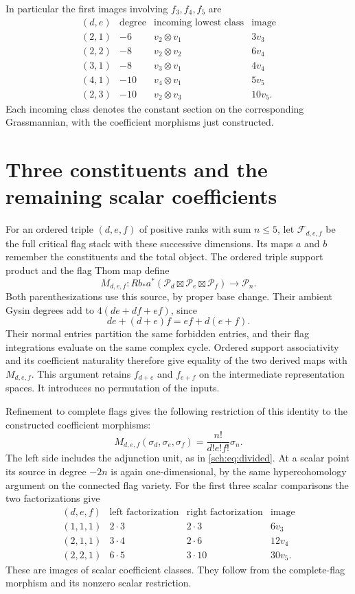 In particular the first images involving $f_3,f_4,f_5$ are
\[
\begin{array}{c|c|c|c}
 (d,e)&\text{degree}&\text{incoming lowest class}&\text{image}\\\hline
 (2,1)&-6&v_2\otimes v_1&3v_3\\
 (2,2)&-8&v_2\otimes v_2&6v_4\\
 (3,1)&-8&v_3\otimes v_1&4v_4\\
 (4,1)&-10&v_4\otimes v_1&5v_5\\
 (2,3)&-10&v_2\otimes v_3&10v_5.
\end{array}
\]
Each incoming class denotes the constant section on the corresponding
Grassmannian, with the coefficient morphisms just constructed.

\section{Three constituents and the remaining scalar coefficients}
\label{sch:sec:coherence}

For an ordered triple $(d,e,f)$ of positive ranks with sum $n\leq5$,
let $\mathcal F_{d,e,f}$ be the full critical flag stack with these
successive dimensions. Its maps $a$ and $b$ remember the constituents
and the total object. The ordered triple support product and the flag
Thom map define
\[
 M_{d,e,f}:Rb_*a^*(\mathcal P_d\boxtimes\mathcal P_e
                         \boxtimes\mathcal P_f)\longrightarrow\mathcal P_n.
\]
Both parenthesizations use this source, by proper base change.
Their ambient Gysin degrees add to
$4(de+df+ef)$, since
\[
 de+(d+e)f=ef+d(e+f).
\]
Their normal entries partition the same forbidden entries, and their
flag integrations evaluate on the same complex cycle. Ordered support
associativity and its coefficient naturality therefore give equality
of the two derived maps with $M_{d,e,f}$.
This argument retains $f_{d+e}$ and $f_{e+f}$ on the intermediate
representation spaces. It introduces no permutation of the inputs.

Refinement to complete flags gives the following restriction of this
identity to the constructed coefficient morphisms:
\begin{equation}
 M_{d,e,f}(\sigma_d,\sigma_e,\sigma_f)
                  =\frac{n!}{d!e!f!}\sigma_n.
 \label{sch:eq:triple}
\end{equation}
The left side includes the adjunction unit, as in
\eqref{sch:eq:divided}. At a scalar point its source in degree $-2n$
is again one-dimensional, by the same hypercohomology argument on
the connected flag variety.
For the first three scalar comparisons the two factorizations give
\[
\begin{array}{c|c|c|c}
 (d,e,f)&\text{left factorization}&\text{right factorization}&\text{image}\\\hline
 (1,1,1)&2\cdot3&2\cdot3&6v_3\\
 (2,1,1)&3\cdot4&2\cdot6&12v_4\\
 (2,2,1)&6\cdot5&3\cdot10&30v_5.
\end{array}
\]
These are images of scalar coefficient classes. They follow from
the complete-flag morphism and its nonzero scalar restriction.

